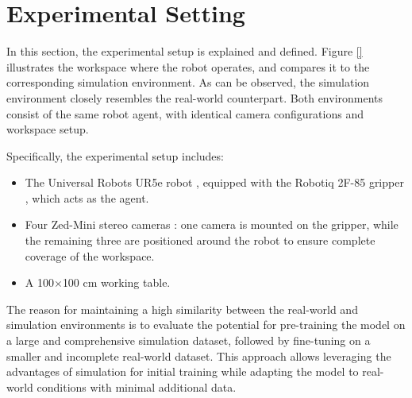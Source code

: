 \section{Experimental Setting}
\label{sec:real_world_exp_setting}
In this section, the experimental setup is explained and defined. Figure \ref{} illustrates the workspace where the robot operates, and compares it to the corresponding simulation environment. As can be observed, the simulation environment closely resembles the real-world counterpart. Both environments consist of the same robot agent, with identical camera configurations and workspace setup.

Specifically, the experimental setup includes:
\begin{itemize}
    \item The Universal Robots UR5e robot \cite{ur5e}, equipped with the Robotiq 2F-85 gripper \cite{robotiq}, which acts as the agent.
    \item Four Zed-Mini stereo cameras \cite{zed}: one camera is mounted on the gripper, while the remaining three are positioned around the robot to ensure complete coverage of the workspace.
    \item A 100$\times$100 cm working table.
\end{itemize}

The reason for maintaining a high similarity between the real-world and simulation environments is to evaluate the potential for pre-training the model on a large and comprehensive simulation dataset, followed by fine-tuning on a smaller and incomplete real-world dataset. This approach allows leveraging the advantages of simulation for initial training while adapting the model to real-world conditions with minimal additional data.
